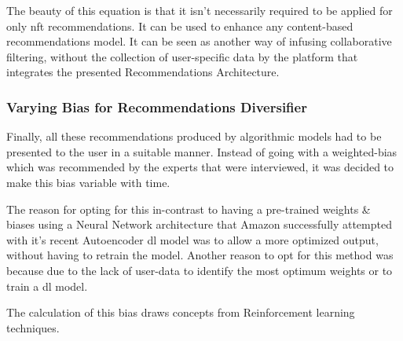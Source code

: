 \bigbreak
The beauty of this equation is that it isn't necessarily required to be applied for only \gls{nft} recommendations. It can be used to enhance any content-based recommendations model. It can be seen as another way of infusing collaborative filtering, without the collection of user-specific data by the platform that integrates the presented Recommendations Architecture.


% 




\subsubsection{Varying Bias for Recommendations Diversifier}
Finally, all these recommendations produced by algorithmic models had to be presented to the user in a suitable manner. Instead of going with a weighted-bias which was recommended by the experts that were interviewed, it was decided to make this bias variable with time. 

The reason for opting for this in-contrast to having a pre-trained weights \& biases using a Neural Network architecture that Amazon successfully attempted with it's recent Autoencoder \autocite{larry_history_2019} \gls{dl} model was to allow a more optimized output, without having to retrain the model. Another reason to opt for this method was because due to the lack of user-data to identify the most optimum weights or to train a \gls{dl} model.

The calculation of this bias draws concepts from Reinforcement learning techniques.


